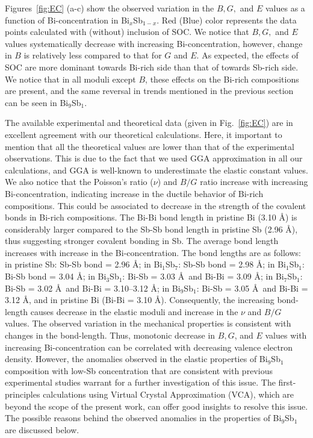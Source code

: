 \documentclass[twocolumn,superscriptaddress,nofootinbib,floatfix,aps,showpacs,prb,citeautoscript,reprint]{revtex4-1}
\begin{document}
Figures~\ref{fig:EC} (a-c) show the observed variation in the $B, G,$ and $E$ values as a function of Bi-concentration in Bi$_{x}$Sb$_{1-x}$. Red (Blue) color represents the data points calculated with (without) inclusion of SOC. We notice that $B, G,$ and $E$ values systematically decrease with increasing Bi-concentration, however, change in $B$ is relatively less compared to that for $G$ and $E$. As expected, the effects of SOC are more dominant towards Bi-rich side than that of towards Sb-rich side. We notice that in all moduli except $B$, these effects on the Bi-rich compositions are present, and the same reversal in trends mentioned in the previous section can be seen in Bi$_{9}$Sb$_{1}$. 

The available experimental and theoretical data (given in Fig.~\ref{fig:EC}) are in excellent agreement with our theoretical calculations.\cite{Gopinathan1974, Jong2015, Lichnowski1976} Here, it important to mention that all the theoretical values are lower than that of the experimental observations. This is due to the fact that we used GGA approximation in all our calculations, and GGA is well-known to underestimate the elastic constant values. \cite{WU_PRB2007} We also notice that the Poisson's ratio ($\nu$) and $B/G$ ratio increase with increasing Bi-concentration, indicating increase in the ductile behavior of Bi-rich compositions. This could be associated to decrease in the strength of the covalent bonds in Bi-rich compositions. The Bi-Bi bond length in pristine Bi (3.10 \AA) is considerably larger compared to the Sb-Sb bond length in pristine Sb (2.96 \AA), thus suggesting stronger covalent bonding in Sb. The average bond length increases with increase in the Bi-concentration. The bond lengths are as follows: in pristine Sb: Sb-Sb bond = 2.96 \AA; in Bi$_{1}$Sb$_{7}$: Sb-Sb bond = 2.98 \AA; in Bi$_{1}$Sb$_{1}$: Bi-Sb bond = 3.04 \AA; in Bi$_{3}$Sb$_{1}$: Bi-Sb = 3.03 \AA~and Bi-Bi = 3.09 \AA; in Bi$_{7}$Sb$_{1}$: Bi-Sb = 3.02 \AA~and Bi-Bi = 3.10--3.12 \AA; in Bi$_{9}$Sb$_{1}$: Bi-Sb = 3.05 \AA~and Bi-Bi = 3.12 \AA, and in pristine Bi (Bi-Bi = 3.10 \AA). Consequently, the increasing bond-length causes decrease in the elastic moduli and increase in the $\nu$ and $B/G$ values. The observed variation in the mechanical properties is consistent with changes in the bond-length. Thus, monotonic decrease in $B, G$, and $E$ values with increasing Bi-concentration can be correlated with decreasing valence electron density. \cite{MCGaoJPCM2013} However, the anomalies observed in the elastic properties of Bi$_{9}$Sb$_{1}$ composition with low-Sb concentration that  are consistent with previous experimental studies\cite{Gopinathan1974} warrant for a further investigation of this issue. The first-principles calculations using Virtual Crystal Approximation (VCA), which are beyond the scope of the present work, can offer good insights to resolve this issue. The possible reasons behind the observed anomalies in the properties of Bi$_{9}$Sb$_{1}$ are discussed below. 
\end{document}
